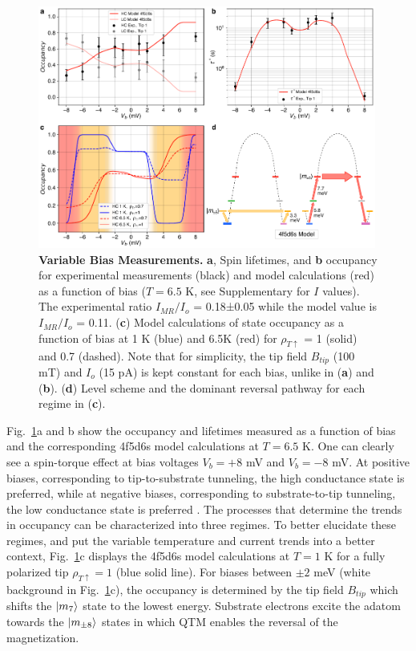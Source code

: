 \documentclass[
reprint,amsmath,amssymb,aps]{revtex4-2}
\begin{document}
\begin{figure}[ht!]
\includegraphics[width=0.99\textwidth]{Fig4_new.pdf}
\caption{\textbf{Variable Bias Measurements.} \textbf{a}, Spin lifetimes, and \textbf{b} occupancy for experimental measurements (black) and model calculations (red) as a function of bias ($T = 6.5$ K, see Supplementary for $I$ values). The experimental ratio $I_{MR}/I_{o}$ = 0.18±0.05 while the model value is $I_{MR}/I_{o}$ = 0.11. (\textbf{c}) Model calculations of state occupancy as a function of bias at 1 K (blue) and 6.5K (red) for $\rho_{T \uparrow}$ = 1 (solid) and 0.7 (dashed). Note that for simplicity, the tip field $B_{tip}$ (100 mT) and $I_o$ (15 pA) is kept constant for each bias, unlike in (\textbf{a}) and (\textbf{b}). (\textbf{d}) Level scheme and the dominant reversal pathway for each regime in (\textbf{c}).   
\label{fig:bias} }
\end{figure}

Fig.~\ref{fig:bias}a and b show the occupancy and lifetimes measured as a function of bias and the corresponding 4f5d6s model calculations at $T=6.5$ K. One can clearly see a spin-torque effect at bias voltages $V_b=+8 $ mV and $V_b=-8 $ mV. At  positive biases, corresponding to tip-to-substrate tunneling, the high conductance state is preferred, while at negative biases, corresponding to substrate-to-tip tunneling, the low conductance state is preferred \cite{Khajetoorians2013,delgadoSpinTransferTorqueSingle2010,balashovInelasticElectronmagnonInteraction2008,krause_joule_2011}. The processes that determine the trends in occupancy can be characterized into three regimes. To better elucidate these regimes, and put the variable temperature and current trends into a better context, Fig.~\ref{fig:bias}c displays the 4f5d6s model calculations at $T=1$ K for a fully polarized tip $\rho_{T \uparrow} = 1 $ (blue solid line). For biases between $\pm 2$ meV (white background in Fig.~\ref{fig:bias}c), the occupancy is determined by the tip field $B_{tip}$ which shifts the $\ket{m_{7}}$ state to the lowest energy. Substrate electrons excite the adatom towards the $\ket{m_{\pm8}}$ states in which QTM enables the reversal of the magnetization.
\end{document}
